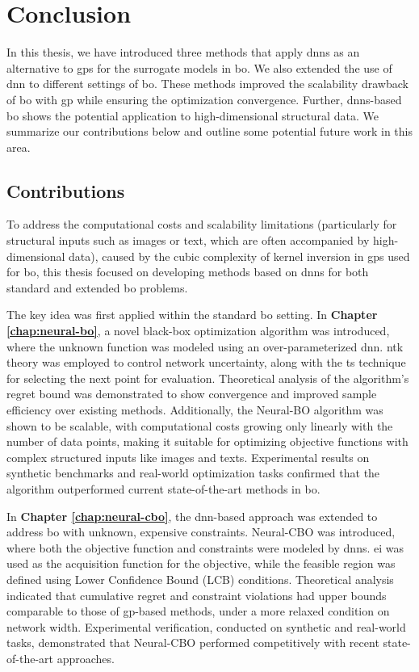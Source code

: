 \chapter{Conclusion} %

\label{chap:conclusion} %

In this thesis, we have introduced three methods that apply \acp{dnn} as an alternative to \acp{gp} for the surrogate models in \ac{bo}. We also extended the use of \ac{dnn} to different settings of \ac{bo}. These methods improved the scalability drawback of \ac{bo} with \ac{gp} while ensuring the optimization convergence. Further, \acp{dnn}-based \acl{bo} shows the potential application to high-dimensional structural data. We summarize our
contributions below and outline some potential future work in this area. 

\section{Contributions}
To address the computational costs and scalability limitations (particularly for structural inputs such as images or text, which are often accompanied by high-dimensional data), caused by the cubic complexity of kernel inversion in \acp{gp} used for \ac{bo}, this thesis focused on developing methods based on \acp{dnn} for both standard and extended \ac{bo} problems.

The key idea was first applied within the standard \ac{bo} setting. In \textbf{Chapter \ref{chap:neural-bo}}, a novel black-box optimization algorithm was introduced, where the unknown function was modeled using an over-parameterized \ac{dnn}. \ac{ntk} theory was employed to control network uncertainty, along with the \ac{ts} technique for selecting the next point for evaluation. Theoretical analysis of the algorithm's regret bound was demonstrated to show convergence and improved sample efficiency over existing methods. Additionally, the Neural-BO algorithm was shown to be scalable, with computational costs growing only linearly with the number of data points, making it suitable for optimizing objective functions with complex structured inputs like images and texts. Experimental results on synthetic benchmarks and real-world optimization tasks confirmed that the algorithm outperformed current state-of-the-art methods in \ac{bo}. 

In \textbf{Chapter \ref{chap:neural-cbo}}, the \ac{dnn}-based approach was extended to address \ac{bo} with unknown, expensive constraints. Neural-CBO was introduced, where both the objective function and constraints were modeled by \acp{dnn}. \ac{ei} was used as the acquisition function for the objective, while the feasible region was defined using Lower Confidence Bound (LCB) conditions. Theoretical analysis indicated that cumulative regret and constraint violations had upper bounds comparable to those of \ac{gp}-based methods, under a more relaxed condition on network width. Experimental verification, conducted on synthetic and real-world tasks, demonstrated that Neural-CBO performed competitively with recent state-of-the-art approaches. 

